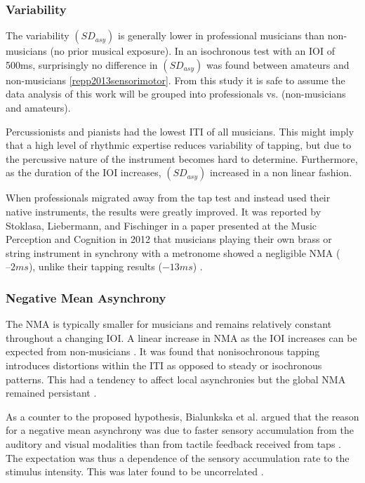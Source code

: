 \subsubsection{Variability}
The variability $(SD_{asy})$ is generally lower in professional musicians than non-musicians (no prior musical exposure). In an isochronous test with an IOI of 500ms, surprisingly no difference in $(SD_{asy})$ was found between amateurs and non-musicians \ref{repp2013sensorimotor}. From this study it is safe to assume the data analysis of this work will be grouped into professionals vs. (non-musicians and amateurs).

Percussionists and pianists had the lowest ITI of all musicians. This might imply that a high level of rhythmic expertise reduces variability of tapping, but due to the percussive nature of the instrument becomes hard to determine. Furthermore, as the duration of the IOI increases, $(SD_{asy})$ increased in a non linear fashion. 

When professionals migrated away from the tap test and instead used their native instruments, the results were greatly improved. It was reported by Stoklasa, Liebermann, and Fischinger in a paper presented at the Music Perception and Cognition in 2012 that musicians playing their own brass or string instrument in synchrony with a metronome showed a negligible NMA ($–2 ms$), unlike their tapping results ($-13 ms$) \cite{repp2013sensorimotor}.

\subsubsection{Negative Mean Asynchrony}
The NMA is typically smaller for musicians and remains relatively constant throughout a changing IOI. A linear increase in NMA as the IOI increases can be expected from non-musicians \cite{repp2013sensorimotor}. It was found that nonisochronous tapping introduces distortions within the ITI as opposed to steady or isochronous patterns. This had a tendency to affect local asynchronies but the global NMA remained persistant \cite{polak2016both}.
 
As a counter to the proposed hypothesis, Bialunkska et al. argued that the reason for a negative mean asynchrony was due to faster sensory accumulation from the auditory and visual modalities than from tactile feedback received from taps \cite{bialunska2011increasing}. The expectation was thus a dependence of the sensory accumulation rate to the stimulus intensity. This was later found to be uncorrelated \cite{bialunska2011increasing}.

